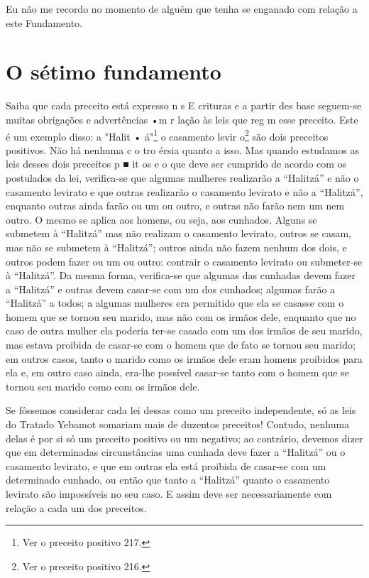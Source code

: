 Eu não me recordo no momento de alguém que tenha se enganado com relação
a este Fundamento.

\chapter*{O sétimo fundamento}

Saiba que cada preceito está expresso n s E crituras e a partir des base
seguem-se muitas obrigações e advertências •m r lação às leis que reg m
esse preceito. Este é um exemplo disso:
a "Halit • á"\footnote{Ver o preceito positivo 217.}
o casamento levir o\footnote{Ver o preceito positivo 216.}
são dois preceitos positivos. Não
há nenhuma c o tro érsia quanto a isso. Mas quando estudamos as leis
desses dois preceitos p ■ it os e o que deve ser cum­prido de acordo com
os postulados da lei, verifica-se que algumas mulheres realizarão a
``Halitzá'' e não o casamento levirato e que outras realizarão o
casa­mento levirato e não a ``Halitzá'', enquanto outras ainda farão ou um
ou outro, e outras não farão nem um nem outro. O mesmo se aplica aos
homens, ou seja, aos cunhados. Alguns se submetem à ``Halitzá'' mas não
realizam o casamento levirato, outros se casam, mas não se submetem à
``Halitzá''; outros ainda não fazem nenhum dos dois, e outros podem fazer
ou um ou outro: contrair o casa­mento levirato ou submeter-se à
``Halitzá''. Da mesma forma, verifica-se que algumas das cunhadas devem
fazer a ``Halitzá'' e outras devem casar-se com um dos cunhados; algumas
farão a ``Halitzá'' a todos; a algumas mulheres era permitido que ela se
casasse com o homem que se tornou seu marido, mas não com os irmãos
dele, enquanto que no caso de outra mulher ela poderia ter-se casado com
um dos irmãos de seu marido, mas estava proibida de casar-se com o homem
que de fato se tornou seu marido; em outros casos, tanto o marido como
os irmãos dele eram homens proibidos para ela e, em outro caso ainda,
era-lhe possível casar-se tanto com o homem que se tornou seu marido
como com os irmãos dele.

Se fôssemos considerar cada lei dessas como um preceito indepen­dente,
só as leis do Tratado Yebamot somariam mais de duzentos preceitos!
Contudo, nenhuma delas é por si só um preceito positivo ou um negativo;
ao contrário, devemos dizer que em determinadas circunstâncias uma
cunhada deve fazer a ``Halitzá'' ou o casamento levirato, e que em outras
ela está proibida de casar-se com um determinado cunhado, ou então que
tanto a ``Halitzá'' quan­to o casamento levirato são impossíveis no seu
caso. E assim deve ser necessa­riamente com relação a cada um dos
preceitos.


